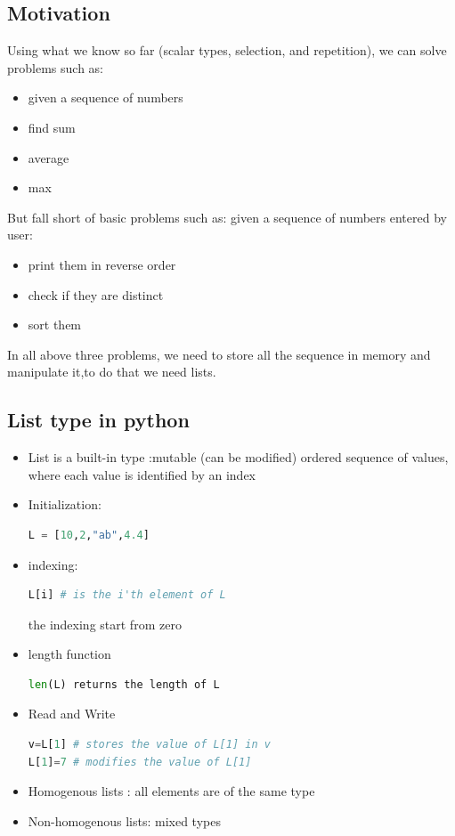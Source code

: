 \documentclass[12pt,oneside]{book}
\begin{document}
\subsection{Motivation}
Using what we know so far (scalar types, selection, and repetition), we can solve problems such as:
\begin{itemize}
	\item given a sequence of numbers
	\item find sum
	\item average
	\item max
\end{itemize}
But fall short of basic problems such as: given a sequence of numbers entered by user:
\begin{itemize}
	\item print them in reverse order
	\item check if they are distinct
	\item sort them
\end{itemize}
In all above three problems, we need to store all the sequence in memory and manipulate it,to do that we need lists.
\subsection{List type in python}
\begin{itemize}
	\item List is a built-in type :mutable (can be modified) ordered sequence of values, where each value is identified by an index
	\item Initialization:
\begin{lstlisting}[language=python]
L = [10,2,"ab",4.4]
\end{lstlisting}
	\item indexing:
\begin{lstlisting}[language=python]
L[i] # is the i'th element of L
\end{lstlisting}
	      the indexing start from zero
	\item length function
\begin{lstlisting}[language=python]
len(L) returns the length of L
\end{lstlisting}
	\item Read and Write
\begin{lstlisting}[language=python]
v=L[1] # stores the value of L[1] in v 
L[1]=7 # modifies the value of L[1]
\end{lstlisting}
	\item Homogenous lists : all elements are of the same type
	\item Non-homogenous lists: mixed types
\end{itemize}
\end{document}
